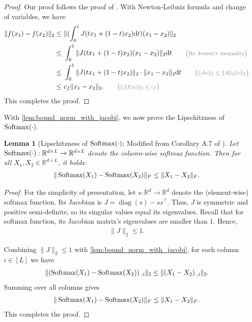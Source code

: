\documentclass[12pt]{article}
\numberwithin{equation}{section}
\newcommand{\Softmax}{\mathop{{\rm Softmax}}}
\DeclareMathOperator{\diag}{diag}
\def\R{\mathbb{R}}
\let\cite\citep
\theoremstyle{theoremstyle}
\newtheorem{lemma}{Lemma}[section]
\numberwithin{equation}{section}
\numberwithin{theorem}{section}
\numberwithin{proposition}{section}
\numberwithin{definition}{section}
\numberwithin{lemma}{section}
\numberwithin{assumption}{section}
\numberwithin{remark}{section}
\newcommand*{\annot}[1]{\tag*{\footnotesize{\textcolor{black!50}{\big(#1\big)}}}}
\begin{document}
\begin{proof}
Our proof follows the proof of \cite[Lemma A.6]{edelman2022inductivebiasesvariablecreation}.
With Newton-Leibniz formula and change of variables, we have
\begin{align*}
    \|f(x_1)-f(x_2)\|_2 \leq & ~
    \|(\int_0^1 J(tx_1+(1-t)x_2) \dd t)(x_1-x_2)\|_2 \\
    \leq & ~
    \int_0^1 \|J(tx_1+(1-t)x_2)(x_1-x_2)\|_2 \dd t \annot{By Jensen's inequality} \\
    \leq & ~
    \int_0^1 \|J(tx_1+(1-t)x_2)\|_2 \cdot \|x_1-x_2\|_2 \dd t \annot{$\|Ax\|_2\leq\|A\|_2\|x\|_2$} \\
    \leq & ~
    c_f\|x_1-x_2\|_2. \annot{$\|J f(x)\|_2\leq c_f$}
\end{align*}
This completes the proof.
\end{proof}

With \cref{lem:bound_norm_with_jacobi}, we now prove the Lipschitzness of $\Softmax(\cdot)$.

\begin{lemma}[Lipschitzness of $\Softmax(\cdot)$; Modified from Corollary A.7 of \cite{edelman2022inductivebiasesvariablecreation}]\label{lem:lipschitzness_of_softmax}
Let $\Softmax(\cdot):\R^{d\times L}\to\R^{d\times L}$ denote the column-wise softmax function.  
Then for all $X_1,X_2\in\R^{d\times L}$, it holds: 
\begin{align*}
\|\Softmax(X_1)-\Softmax(X_2)\|_F\leq \|X_1-X_2\|_F.
\end{align*}
\end{lemma}

\begin{proof}

For the simplicity of presentation, let $s:\R^d \to \R^d$ denote the (element-wise) softmax function.
Its Jacobian is $J=\diag(s)-ss^\top$.
Thus, $J$ is symmetric and positive semi-definite, so its singular values equal its eigenvalues. 
Recall that for softmax function, its Jacobian matrix's eigenvalues are smaller than 1.
Hence, 
\begin{align*}
    \|J\|_2\leq1.    
\end{align*}

Combining  $\|J\|_2\leq1$ with \cref{lem:bound_norm_with_jacobi}, for each column $i\in[L]$ we have
\begin{align*}
    \|(\Softmax(X_1)-\Softmax(X_2))_{\cdot,i}\|_2 \leq \|(X_1-X_2)_{\cdot,i}\|_2.
\end{align*}
Summing over all columns gives
\begin{align*}
    \|\Softmax(X_1)-\Softmax(X_2)\|_F\leq \|X_1-X_2\|_F.
\end{align*}
This completes the proof.
\end{proof}
\end{document}
